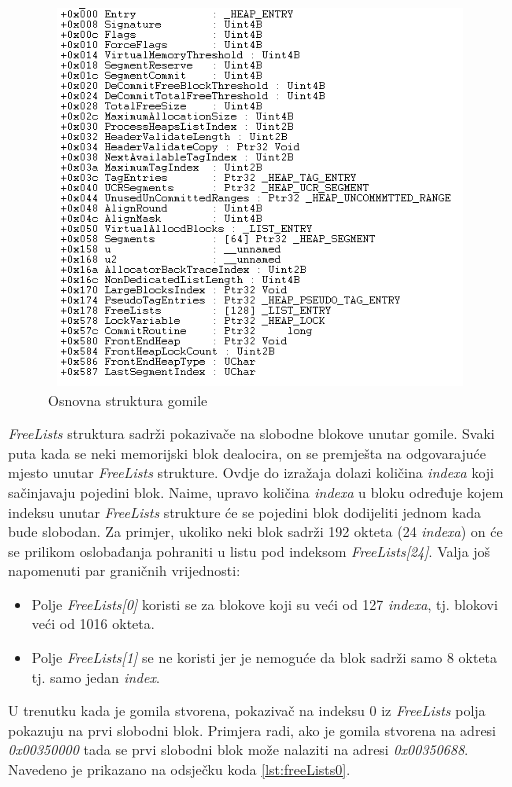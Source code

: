 \documentclass[times, utf8, diplomski, numeric]{fer}
\begin{document}
\begin{figure}[!ht]
\centering
\setlength\fboxsep{0pt}
\setlength\fboxrule{0.5pt}
\includegraphics[width=12cm, height=10cm]{slike/heap_structure}
\caption{Osnovna struktura gomile}
\label{fig:heap_structure} 
\end{figure}
\emph{FreeLists} struktura sadrži pokazivače na slobodne blokove unutar gomile. Svaki puta kada se neki memorijski blok dealocira, on se premješta na odgovarajuće mjesto unutar \emph{FreeLists} strukture. Ovdje do izražaja dolazi količina \emph{indexa} koji sačinjavaju pojedini blok. Naime, upravo količina \emph{indexa} u bloku određuje kojem indeksu unutar \emph{FreeLists} strukture će se pojedini blok dodijeliti jednom kada bude slobodan. Za primjer, ukoliko neki blok sadrži 192 okteta (24 \emph{indexa}) on će se prilikom oslobađanja pohraniti u listu pod indeksom \emph{FreeLists[24]}. Valja još napomenuti par graničnih vrijednosti:
\begin{itemize}
\item Polje \emph{FreeLists[0]} koristi se za blokove koji su veći od 127 \emph{indexa}, tj. blokovi veći od 1016 okteta.
\item Polje \emph{FreeLists[1]} se ne koristi jer je nemoguće da blok sadrži samo 8 okteta tj. samo jedan \emph{index}.
\end{itemize}
U trenutku kada je gomila stvorena, pokazivač na indeksu 0 iz \emph{FreeLists} polja pokazuju na prvi slobodni blok. Primjera radi, ako je gomila stvorena na adresi \emph{0x00350000} tada se prvi slobodni blok može nalaziti na adresi \emph{0x00350688}. Navedeno je prikazano na odsječku koda \ref{lst:freeLists0}.
\end{document}
